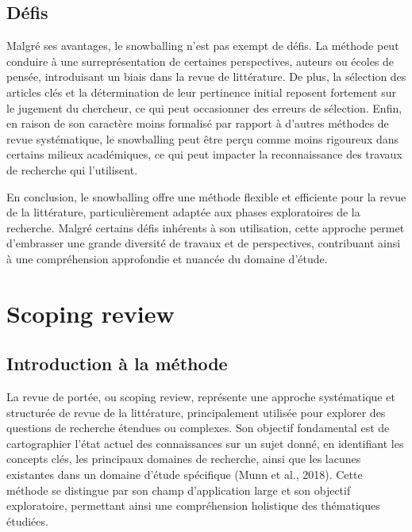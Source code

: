 \documentclass[
  letterpaper,
]{scrbook}
\begin{document}
\hypertarget{duxe9fis}{%
\subsection{Défis}\label{duxe9fis}}

Malgré ses avantages, le snowballing n'est pas exempt de défis. La
méthode peut conduire à une surreprésentation de certaines perspectives,
auteurs ou écoles de pensée, introduisant un biais dans la revue de
littérature. De plus, la sélection des articles clés et la détermination
de leur pertinence initial reposent fortement sur le jugement du
chercheur, ce qui peut occasionner des erreurs de sélection. Enfin, en
raison de son caractère moins formalisé par rapport à d'autres méthodes
de revue systématique, le snowballing peut être perçu comme moins
rigoureux dans certains milieux académiques, ce qui peut impacter la
reconnaissance des travaux de recherche qui l'utilisent.

En conclusion, le snowballing offre une méthode flexible et efficiente
pour la revue de la littérature, particulièrement adaptée aux phases
exploratoires de la recherche. Malgré certains défis inhérents à son
utilisation, cette approche permet d'embrasser une grande diversité de
travaux et de perspectives, contribuant ainsi à une compréhension
approfondie et nuancée du domaine d'étude.

\hypertarget{scoping-review}{%
\section{Scoping review}\label{scoping-review}}

\hypertarget{introduction-uxe0-la-muxe9thode-1}{%
\subsection{Introduction à la
méthode}\label{introduction-uxe0-la-muxe9thode-1}}

La revue de portée, ou scoping review, représente une approche
systématique et structurée de revue de la littérature, principalement
utilisée pour explorer des questions de recherche étendues ou complexes.
Son objectif fondamental est de cartographier l'état actuel des
connaissances sur un sujet donné, en identifiant les concepts clés, les
principaux domaines de recherche, ainsi que les lacunes existantes dans
un domaine d'étude spécifique (Munn et al., 2018). Cette méthode se
distingue par son champ d'application large et son objectif
exploratoire, permettant ainsi une compréhension holistique des
thématiques étudiées.
\end{document}
